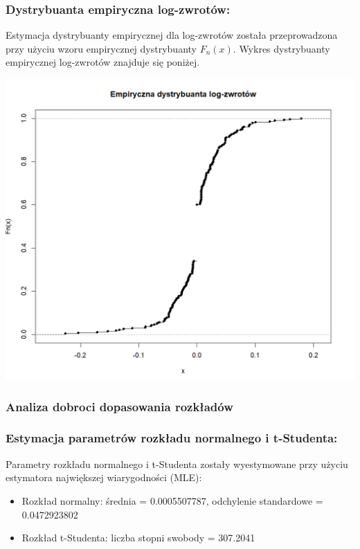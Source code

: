 \documentclass[a4paper,11pt]{article}
\begin{document}
\subsubsection{Dystrybuanta empiryczna log-zwrotów:}

Estymacja dystrybuanty empirycznej dla log-zwrotów została przeprowadzona przy użyciu wzoru empirycznej dystrybuanty $F_n(x)$. Wykres dystrybuanty empirycznej log-zwrotów znajduje się poniżej.

\centerline{\includegraphics[width=14cm]{./Janek/empiryczna dystrybuanta.png}} 

\subsubsection{Analiza dobroci dopasowania rozkładów}

\subsubsection{Estymacja parametrów rozkładu normalnego i t-Studenta:}

Parametry rozkładu normalnego i t-Studenta zostały wyestymowane przy użyciu estymatora największej wiarygodności (MLE):
\begin{itemize}
    \item Rozkład normalny: średnia = 0.0005507787, odchylenie standardowe = 0.0472923802
    \item Rozkład t-Studenta: liczba stopni swobody = 307.2041
\end{itemize}
\end{document}
